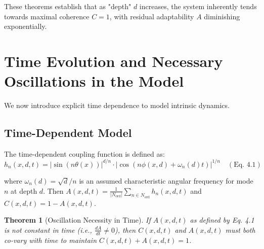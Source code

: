 \documentclass[11pt,a4paper]{article}
\newtheorem{theorem}{Theorem}[section]
\begin{document}
These theorems establish that as "depth" $d$ increases, the system inherently tends towards maximal coherence $C=1$, with residual adaptability $A$ diminishing exponentially.

\section{Time Evolution and Necessary Oscillations in the Model}

We now introduce explicit time dependence to model intrinsic dynamics.

\subsection{Time-Dependent Model}

The time-dependent coupling function is defined as:
\begin{equation}
    h_n(x,d,t) = |\sin(n\theta(x))|^{d/n} \cdot |\cos(n\phi(x,d) + \omega_n(d)t)|^{1/n} \quad (\text{Eq. 4.1})
\end{equation}

where $\omega_n(d) = \sqrt{d}/n$ is an assumed characteristic angular frequency for mode $n$ at depth $d$.
Then $A(x,d,t) = \frac{1}{|N_{\text{ord}}|} \sum_{n \in N_{\text{ord}}} h_n(x,d,t)$ and $C(x,d,t) = 1 - A(x,d,t)$.

\begin{theorem}[Oscillation Necessity in Time]
If $A(x,d,t)$ as defined by Eq. 4.1 is not constant in time (i.e., $\frac{dA}{dt} \neq 0$), then $C(x,d,t)$ and $A(x,d,t)$ must both co-vary with time to maintain $C(x,d,t)+A(x,d,t)=1$.
\end{theorem}
\end{document}
